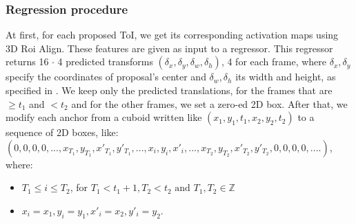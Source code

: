 \subsubsection{Regression procedure}
At first, for each proposed ToI, we get its corresponding activation maps using 3D Roi Align. These features are given as input to a regressor. This regressor returns 16 $\cdot$ 4 predicted
transforms $(\delta_x,\delta_y, \delta_w,\delta_h)$, 4 for each frame, where $ \delta_x, \delta_y$ specify the coordinates of proposal's center and $\delta_w, \delta_h$ its width and height, as specified
in \cite{DBLP:journals/corr/GirshickDDM13}.  We keep only the predicted translations, for the frames that are $\ge t_1$ and $< t_2$ and for the other frames, we set a zero-ed 2D box. 
After that, we modify each anchor from a cuboid written like $(x_1,y_1,t_1, x_2, y_2, t_2)$ to a sequence of 2D boxes, like: \\
$(0,0,0,0, ..., x_{T_1},y_{T_1},x'_{T_1},y'_{T_1}, ... ,x_{i},y_{i},x'_{i}, ..., x_{T_2},y_{T_2},x'_{T_2},y'_{T_2}, 0,0,0,0, ....)$, \\
where:
\begin{itemize}
\item $ T_1 \le i \le T_2$, for $T_1 < t_1 + 1,  T_2 < t_2 \text{ and }T_1,T_2 \in \mathbb{Z} $
\item $ x_i = x_1, y_i= y_1, x'_i = x_2, y'_i = y_2 $.
\end{itemize}

